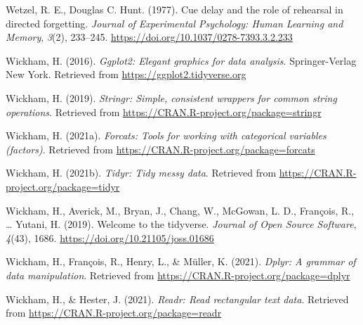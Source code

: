 \documentclass[
  english,
  man,floatsintext]{apa6}
\begin{document}
\leavevmode\hypertarget{ref-WetzelC1977}{}%
Wetzel, R. E., Douglas C. Hunt. (1977). Cue delay and the role of rehearsal in directed forgetting. \emph{Journal of Experimental Psychology: Human Learning and Memory}, \emph{3}(2), 233--245. \url{https://doi.org/10.1037/0278-7393.3.2.233}

\leavevmode\hypertarget{ref-R-ggplot2}{}%
Wickham, H. (2016). \emph{Ggplot2: Elegant graphics for data analysis}. Springer-Verlag New York. Retrieved from \url{https://ggplot2.tidyverse.org}

\leavevmode\hypertarget{ref-R-stringr}{}%
Wickham, H. (2019). \emph{Stringr: Simple, consistent wrappers for common string operations}. Retrieved from \url{https://CRAN.R-project.org/package=stringr}

\leavevmode\hypertarget{ref-R-forcats}{}%
Wickham, H. (2021a). \emph{Forcats: Tools for working with categorical variables (factors)}. Retrieved from \url{https://CRAN.R-project.org/package=forcats}

\leavevmode\hypertarget{ref-R-tidyr}{}%
Wickham, H. (2021b). \emph{Tidyr: Tidy messy data}. Retrieved from \url{https://CRAN.R-project.org/package=tidyr}

\leavevmode\hypertarget{ref-R-tidyverse}{}%
Wickham, H., Averick, M., Bryan, J., Chang, W., McGowan, L. D., François, R., \ldots{} Yutani, H. (2019). Welcome to the tidyverse. \emph{Journal of Open Source Software}, \emph{4}(43), 1686. \url{https://doi.org/10.21105/joss.01686}

\leavevmode\hypertarget{ref-R-dplyr}{}%
Wickham, H., François, R., Henry, L., \& Müller, K. (2021). \emph{Dplyr: A grammar of data manipulation}. Retrieved from \url{https://CRAN.R-project.org/package=dplyr}

\leavevmode\hypertarget{ref-R-readr}{}%
Wickham, H., \& Hester, J. (2021). \emph{Readr: Read rectangular text data}. Retrieved from \url{https://CRAN.R-project.org/package=readr}

\endgroup
\end{document}
